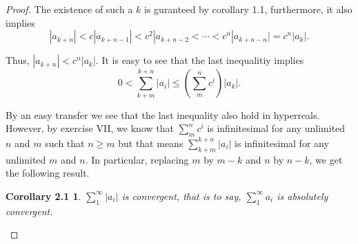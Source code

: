 \documentclass[a4paper, 11pt, openany]{book}
\theoremstyle{plain}
\newtheorem*{corollary2.1}{Corollary 2.1}
\theoremstyle{plain}
\begin{document}
\begin{proof}
      The existence of such a $k$ is guranteed by corollary 1.1, furthermore, it also implies $$|a_{k+n}|< c |a_{k+n-1}|<c^2 |a_{k+n-2}<\cdots < c^n |a_{k+n-n}|=c^n |a_k|.$$

      Thus, $|a_{k+n}|<c^n |a_k|$. It is easy to see that the last inequalitiy implies $$0< \sum_{k+m}^{k+n} |a_i| 
      \leq \left( \sum_{m}^n c^i \right) |a_k|.$$

      By an easy transfer we see that the last inequality also hold in hyperreals. However, by exercise VII, we know that $\sum_{m}^n c^i$ is infinitesimal for any unlimited $n$ and $m$ such that $n\geq m$ but that means $\sum_{k+m}^{k+n} |a_i|$ is infinitesimal for any unlimited $m$ and $n$. In particular, replacing $m$ by $m-k$ and $n$ by $n-k$, we get the following result. 
      
      \begin{corollary2.1}
        $\sum_{1}^\infty |a_i|$ is convergent, that is to say, $\sum_{1}^\infty a_i$ is absolutely convergent.
      \end{corollary2.1}
  \end{proof}
\end{document}
